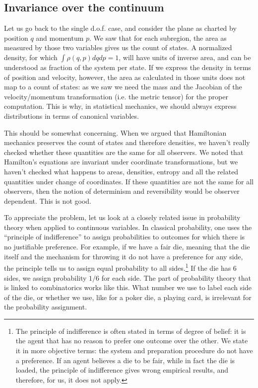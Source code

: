\subsection{Invariance over the continuum}

Let us go back to the single d.o.f. case, and consider the plane as charted by position $q$ and momentum $p$. We saw that for each subregion, the area as measured by those two variables gives us the count of states. A normalized density, for which $\int \rho(q, p) dq dp = 1$, will have units of inverse area, and can be understood as fraction of the system per state. If we express the density in terms of position and velocity, however, the area as calculated in those units does not map to a count of states: as we saw we need the mass and the Jacobian of the velocity/momentum transformation (i.e. the metric tensor) for the proper computation. This is why, in statistical mechanics, we should always express distributions in terms of canonical variables.

This should be somewhat concerning. When we argued that Hamiltonian mechanics preserves the count of states and therefore densities, we haven't really checked whether these quantities are the same for all observers. We noted that Hamilton's equations are invariant under coordinate transformations, but we haven't checked what happens to areas, densities, entropy and all the related quantities under change of coordinates. If these quantities are not the same for all observers, then the notion of determinism and reversibility would be observer dependent. This is not good.

To appreciate the problem, let us look at a closely related issue in  probability theory when applied to continuous variables. In classical probability, one uses the ``principle of indifference'' to assign probabilities to outcomes for which there is no justifiable preference. For example, if we have a fair die, meaning that the die itself and the mechanism for throwing it do not have a preference for any side, the principle tells us to assign equal probability to all sides.\footnote{The principle of indifference is often stated in terms of degree of belief: it is the agent that has no reason to prefer one outcome over the other. We state it in more objective terms: the system and preparation procedure do not have a preference. If an agent believes a die to be fair, while in fact the die is loaded, the principle of indifference gives wrong empirical results, and therefore, for us, it does not apply.} If the die has 6 sides, we assign probability $1/6$ for each side. The part of probability theory that is linked to combinatorics works like this. What number we use to label each side of the die, or whether we use, like for a poker die, a playing card, is irrelevant for the probability assignment. 

